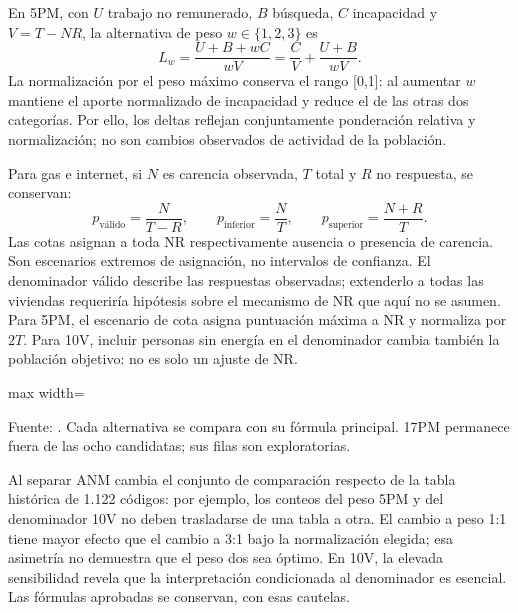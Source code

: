 En 5PM, con $U$ trabajo no remunerado, $B$ búsqueda, $C$ incapacidad y $V=T-NR$, la alternativa de peso $w\in\{1,2,3\}$ es
\begin{equation}
L_w=\frac{U+B+wC}{wV}=\frac{C}{V}+\frac{U+B}{wV}.
\end{equation}
La normalización por el peso máximo conserva el rango [0,1]: al aumentar $w$ mantiene el aporte normalizado de incapacidad y reduce el de las otras dos categorías. Por ello, los deltas reflejan conjuntamente ponderación relativa y normalización; no son cambios observados de actividad de la población.

Para gas e internet, si $N$ es carencia observada, $T$ total y $R$ no respuesta, se conservan:
\begin{equation}
p_{\text{válido}}=\frac{N}{T-R},\qquad
p_{\mathrm{inferior}}=\frac{N}{T},\qquad
p_{\mathrm{superior}}=\frac{N+R}{T}.
\end{equation}
Las cotas asignan a toda NR respectivamente ausencia o presencia de carencia. Son escenarios extremos de asignación, no intervalos de confianza. El denominador válido describe las respuestas observadas; extenderlo a todas las viviendas requeriría hipótesis sobre el mecanismo de NR que aquí no se asumen. Para 5PM, el escenario de cota asigna puntuación máxima a NR y normaliza por $2T$. Para 10V, incluir personas sin energía en el denominador cambia también la población objetivo: no es solo un ajuste de NR.

\begin{table}[htbp]
\centering\small
\caption{Sensibilidad de fórmulas en las 1.102 unidades municipales e insulares}\label{tab:sensibilidad_actual}
\begin{adjustbox}{max width=\textwidth}

\end{adjustbox}
\par\footnotesize Fuente: . Cada alternativa se compara con su fórmula principal. 17PM permanece fuera de las ocho candidatas; sus filas son exploratorias.
\end{table}

Al separar ANM cambia el conjunto de comparación respecto de la tabla histórica de 1.122 códigos: por ejemplo, los conteos del peso 5PM y del denominador 10V no deben trasladarse de una tabla a otra. El cambio a peso 1:1 tiene mayor efecto que el cambio a 3:1 bajo la normalización elegida; esa asimetría no demuestra que el peso dos sea óptimo. En 10V, la elevada sensibilidad revela que la interpretación condicionada al denominador es esencial. Las fórmulas aprobadas se conservan, con esas cautelas.

